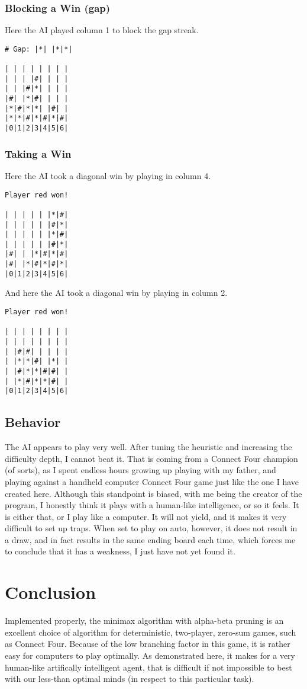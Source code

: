 \documentclass[12pt, article]{scrartcl}
\begin{document}
\subsubsection{Blocking a Win (gap)}
Here the AI played column 1 to block the gap streak.
\begin{verbatim}
# Gap: |*| |*|*|

| | | | | | | |
| | | |#| | | |
| | |#|*| | | |
|#| |*|#| | | |
|*|#|*|*| |#| |
|*|*|#|*|#|*|#|
|0|1|2|3|4|5|6|
\end{verbatim}

\subsubsection{Taking a Win}
Here the AI took a diagonal win by playing in column 4.
\begin{verbatim}
Player red won!

| | | | | |*|#|
| | | | | |#|*|
| | | | | |*|#|
| | | | | |#|*|
|#| | |*|#|*|#|
|#| |*|#|*|#|*|
|0|1|2|3|4|5|6|
\end{verbatim}
And here the AI took a diagonal win by playing in column 2.
\begin{verbatim}
Player red won!

| | | | | | | |
| | | | | | | |
| |#|#| | | | |
| |*|*|#| |*| |
| |#|*|*|#|#| |
| |*|#|*|*|#| |
|0|1|2|3|4|5|6|
\end{verbatim}

\subsection{Behavior}
The AI appears to play very well. After tuning the heuristic and increasing the difficulty depth, I cannot beat it. That is coming from a Connect Four champion (of sorts), as I spent endless hours growing up playing with my father, and playing against a handheld computer Connect Four game just like the one I have created here. Although this standpoint is biased, with me being the creator of the program, I honestly think it plays with a human-like intelligence, or so it feels. It is either that, or I play like a computer. It will not yield, and it makes it very difficult to set up traps. When set to play on auto, however, it does not result in a draw, and in fact results in the same ending board each time, which forces me to conclude that it has a weakness, I just have not yet found it.

\section{Conclusion}
Implemented properly, the minimax algorithm with alpha-beta pruning is an excellent choice of algorithm for deterministic, two-player, zero-sum games, such as Connect Four. Because of the low branching factor in this game, it is rather easy for computers to play optimally. As demonstrated here, it makes for a very human-like artifically intelligent agent, that is difficult if not impossible to best with our less-than optimal minds (in respect to this particular task).
\end{document}
